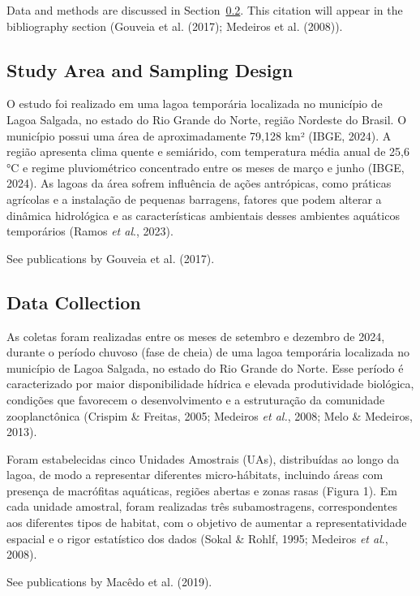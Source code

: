 \documentclass[
  american,
  letterpaper,
  DIV=11,
  numbers=noendperiod]{scrartcl}
\begin{document}
Data and methods are discussed in Section~\ref{sec-data-col}. This
citation will appear in the bibliography section (Gouveia et al. (2017);
Medeiros et al. (2008)).

\subsection{Study Area and Sampling
Design}\label{study-area-and-sampling-design}

O estudo foi realizado em uma lagoa temporária localizada no município
de Lagoa Salgada, no estado do Rio Grande do Norte, região Nordeste do
Brasil. O município possui uma área de aproximadamente 79,128 km² (IBGE,
2024). A região apresenta clima quente e semiárido, com temperatura
média anual de 25,6 °C e regime pluviométrico concentrado entre os meses
de março e junho (IBGE, 2024). As lagoas da área sofrem influência de
ações antrópicas, como práticas agrícolas e a instalação de pequenas
barragens, fatores que podem alterar a dinâmica hidrológica e as
características ambientais desses ambientes aquáticos temporários (Ramos
\emph{et al}., 2023).

See publications by Gouveia et al. (2017).

\subsection{Data Collection}\label{sec-data-col}

As coletas foram realizadas entre os meses de setembro e dezembro de
2024, durante o período chuvoso (fase de cheia) de uma lagoa temporária
localizada no município de Lagoa Salgada, no estado do Rio Grande do
Norte. Esse período é caracterizado por maior disponibilidade hídrica e
elevada produtividade biológica, condições que favorecem o
desenvolvimento e a estruturação da comunidade zooplanctônica (Crispim
\& Freitas, 2005; Medeiros \emph{et al.}, 2008; Melo \& Medeiros, 2013).

Foram estabelecidas cinco Unidades Amostrais (UAs), distribuídas ao
longo da lagoa, de modo a representar diferentes micro-hábitats,
incluindo áreas com presença de macrófitas aquáticas, regiões abertas e
zonas rasas (Figura 1). Em cada unidade amostral, foram realizadas três
subamostragens, correspondentes aos diferentes tipos de habitat, com o
objetivo de aumentar a representatividade espacial e o rigor estatístico
dos dados (Sokal \& Rohlf, 1995; Medeiros \emph{et al}., 2008).

See publications by Macêdo et al. (2019).
\end{document}
